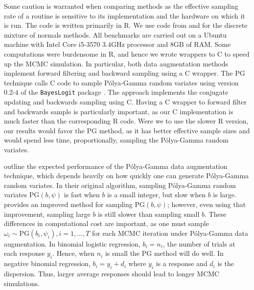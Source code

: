 \documentclass[11pt]{article}
\newcommand{\Polya}{P\'{o}lya}
\newcommand{\PG}{\text{PG}}
\begin{document}
Some caution is warranted when comparing methods as the effective sampling rate
of a routine is sensitive to its implementation and the hardware on which it is
run. The code is written primarily in R.  We use code from
\cite{binomlogit-2012} and \cite{fruhwirth-schnatter-book-2007} for the discrete
mixture of normals methods.  All benchmarks are carried out on a Ubuntu machine
with Intel Core i5-3570 3.4GHz processor and 8GB of RAM.  Some computations were
burdensome in R, and hence we wrote wrappers to C to speed up the MCMC
simulation.  In particular, both data augmentation methods implement forward
filtering and backward sampling using a C wrapper.  The PG technique calls C
code to sample \Polya-Gamma random variates using version 0.2-4 of the
\texttt{BayesLogit} package \citep{bayeslogit-2013}.  The
\cite{ravines-etal-2006} approach implements the conjugate updating and
backwards sampling using C.  Having a C wrapper to forward filter and backwards
sample is particularly important, as our C implementation is much faster than
the corresponding R code.  Were we to use the slower R version, our results
would favor the PG method, as it has better effective sample sizes and would
spend less time, proportionally, sampling the \Polya-Gamma random variates.

\cite{polson-etal-2013} outline the expected performance of the \Polya-Gamma
data augmentation technique, which depends heavily on how quickly one can
generate \Polya-Gamma random variates.  In their original algorithm, sampling
\Polya-Gamma random variates $\PG(b,\psi)$ is fast when $b$ is a small integer,
but slow when $b$ is large. \cite{windle-thesis-2013} provides an improved
method for sampling $\PG(b,\psi)$; however, even using that improvement,
sampling large $b$ is still slower than sampling small $b$.  These differences
in computational cost are important, as one must sample $\omega_i \sim \PG(b_i,
\psi_i), i=1,\ldots,T$ for each MCMC iteration under \Polya-Gamma data
augmentation.  In binomial logistic regression, $b_i = n_i$, the number of
trials at each response $y_i$.  Hence, when $n_i$ is small the PG method will do
well.  In negative binomial regression, $b_i = y_i + d_i$ where $y_i$ is a
response and $d_i$ is the dispersion.  Thus, larger average responses should
lead to longer MCMC simulations.
\end{document}
